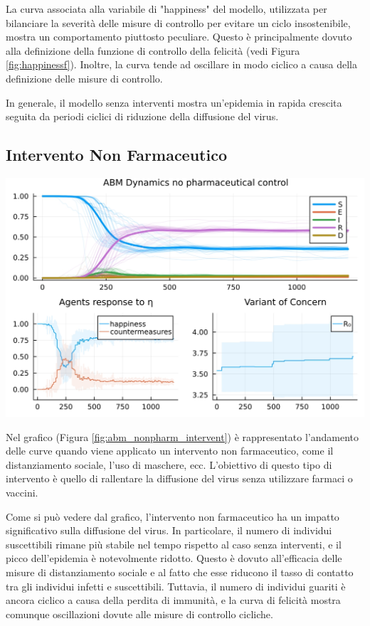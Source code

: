 La curva associata alla variabile di "happiness" del modello, 
utilizzata per bilanciare la severità delle misure di controllo 
per evitare un ciclo insostenibile, mostra un comportamento 
piuttosto peculiare. Questo è principalmente dovuto alla 
definizione della funzione di controllo della felicità 
(vedi Figura \ref{fig:happinessf}). Inoltre, la curva tende 
ad oscillare in modo ciclico a causa della definizione delle 
misure di controllo.

In generale, il modello senza interventi mostra un'epidemia in 
rapida crescita seguita da periodi ciclici di riduzione della 
diffusione del virus.

\subsection{Intervento Non Farmaceutico}

\begin{minipage}{\linewidth}
    \centering
    \includegraphics[width=\textwidth]{img/SocialNetworkABM_CONTROL.jpg}
    \label{fig:abm_nonpharm_intervent}
\end{minipage}

Nel grafico (Figura \ref{fig:abm_nonpharm_intervent}) è 
rappresentato l'andamento delle curve quando viene applicato un 
intervento non farmaceutico, come il distanziamento sociale, 
l'uso di maschere, ecc. L'obiettivo di questo tipo di intervento 
è quello di rallentare la diffusione del virus senza utilizzare 
farmaci o vaccini.

Come si può vedere dal grafico, l'intervento non farmaceutico 
ha un impatto significativo sulla diffusione del virus. 
In particolare, il numero di individui suscettibili rimane 
più stabile nel tempo rispetto al caso senza interventi, e il 
picco dell'epidemia è notevolmente ridotto. Questo è dovuto 
all'efficacia delle misure di distanziamento sociale e al fatto 
che esse riducono il tasso di contatto tra gli individui infetti 
e suscettibili. Tuttavia, il numero di individui guariti è ancora 
ciclico a causa della perdita di immunità, e la curva di felicità 
mostra comunque oscillazioni dovute alle misure di controllo cicliche.

